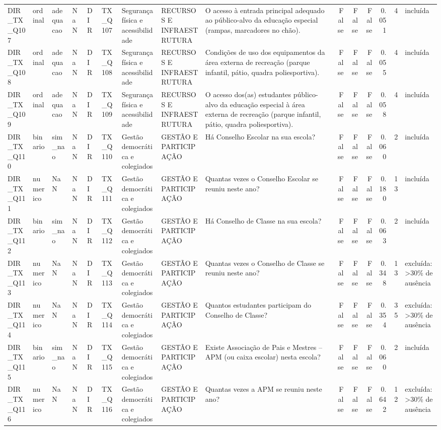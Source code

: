 \begin{tabular}{lllllllllrrrrrl}
DIR\_TX\_Q107 & ordinal & adequacao & NaN & DIR & TX\_Q107 & Segurança física e acessibilidade & RECURSOS E INFRAESTRUTURA & O acesso à entrada principal adequado ao público-alvo da educação especial (rampas, marcadores no chão). & False & False & False & 0.051 & 4 & incluída \\
DIR\_TX\_Q108 & ordinal & adequacao & NaN & DIR & TX\_Q108 & Segurança física e acessibilidade & RECURSOS E INFRAESTRUTURA & Condições de uso dos equipamentos da área externa de recreação (parque infantil, pátio, quadra poliesportiva). & False & False & False & 0.055 & 4 & incluída \\
DIR\_TX\_Q109 & ordinal & adequacao & NaN & DIR & TX\_Q109 & Segurança física e acessibilidade & RECURSOS E INFRAESTRUTURA & O acesso dos(as) estudantes público-alvo da educação especial à área externa de recreação (parque infantil, pátio, quadra poliesportiva). & False & False & False & 0.058 & 4 & incluída \\
DIR\_TX\_Q110 & binario & sim\_nao & NaN & DIR & TX\_Q110 & Gestão democrática e colegiados & GESTÃO E PARTICIPAÇÃO & Há Conselho Escolar na sua escola? & False & False & False & 0.060 & 2 & incluída \\
DIR\_TX\_Q111 & numerico & NaN & NaN & DIR & TX\_Q111 & Gestão democrática e colegiados & GESTÃO E PARTICIPAÇÃO & Quantas vezes o Conselho Escolar se reuniu neste ano? & False & False & False & 0.180 & 13 & incluída \\
DIR\_TX\_Q112 & binario & sim\_nao & NaN & DIR & TX\_Q112 & Gestão democrática e colegiados & GESTÃO E PARTICIPAÇÃO & Há Conselho de Classe na sua escola? & False & False & False & 0.063 & 2 & incluída \\
DIR\_TX\_Q113 & numerico & NaN & NaN & DIR & TX\_Q113 & Gestão democrática e colegiados & GESTÃO E PARTICIPAÇÃO & Quantas vezes o Conselho de Classe se reuniu neste ano? & False & False & False & 0.348 & 13 & excluída: >30\% de ausência \\
DIR\_TX\_Q114 & numerico & NaN & NaN & DIR & TX\_Q114 & Gestão democrática e colegiados & GESTÃO E PARTICIPAÇÃO & Quantos estudantes participam do Conselho de Classe? & False & False & False & 0.354 & 35 & excluída: >30\% de ausência \\
DIR\_TX\_Q115 & binario & sim\_nao & NaN & DIR & TX\_Q115 & Gestão democrática e colegiados & GESTÃO E PARTICIPAÇÃO & Existe Associação de Pais e Mestres – APM (ou caixa escolar) nesta escola? & False & False & False & 0.060 & 2 & incluída \\
DIR\_TX\_Q116 & numerico & NaN & NaN & DIR & TX\_Q116 & Gestão democrática e colegiados & GESTÃO E PARTICIPAÇÃO & Quantas vezes a APM se reuniu neste ano? & False & False & False & 0.642 & 12 & excluída: >30\% de ausência \\

\end{tabular}

